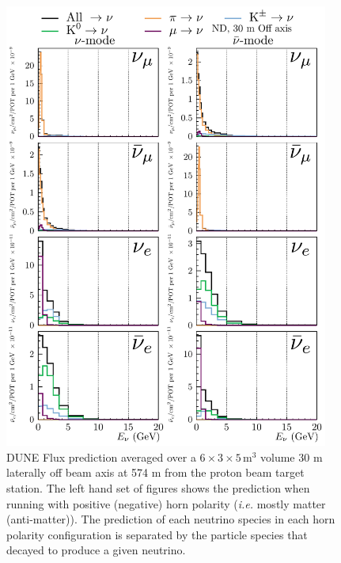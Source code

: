 \documentclass{article}
\begin{document}
\begin{figure}
  \centering
  \includegraphics[width=0.95\textwidth]{plots/fluxpredcompvar/ND_HadronParentFluxComponents_30m_offaxis}
  \caption{DUNE Flux prediction averaged over a $6\times 3\times 5\,\textrm{m}^{3}$ volume 30 m laterally off beam axis at 574 m from the proton beam target station. The left hand set of figures shows the prediction when running with positive (negative) horn polarity (\textit{i.e.} mostly matter (anti-matter)). The prediction of each neutrino species in each horn polarity configuration is separated by the particle species that decayed to produce a given neutrino.}
  \label{fig:flux_predictions__off_axis}
\end{figure}
\end{document}
